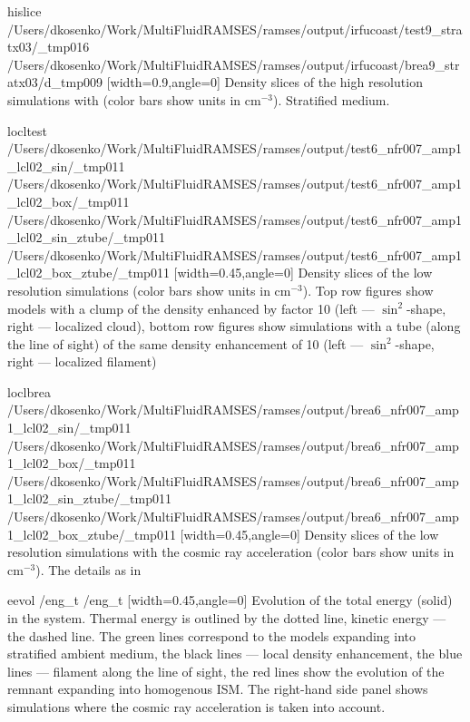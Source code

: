 \documentclass[referee,oldversion]{aa}
\def\basedir{/Users/dkosenko/Work/MultiFluidRAMSES/ramses/output}
\begin{document}
\def\thstra{\basedir/irfucoast/test9_stratx03}
\def\bhstra{\basedir/irfucoast/brea9_stratx03}
\def\slice{d_tmp009}
\FIGG hislice   {\thstra/_tmp016}  {\bhstra/\slice}  [width=0.9\hsize,angle=0]  Density slices of the high resolution simulations with (color bars show units in cm$^{-3}$). Stratified medium.


\def\clumsin{\basedir/test6_nfr007_amp1_lcl02_sin}
\def\clumbox{\basedir/test6_nfr007_amp1_lcl02_box}
\def\tubesin{\basedir/test6_nfr007_amp1_lcl02_sin_ztube}
\def\tubebox{\basedir/test6_nfr007_amp1_lcl02_box_ztube}
\def\slice{_tmp011}
\FIGfo locltest  {\clumsin/\slice}  {\clumbox/\slice}  {\tubesin/\slice}  {\tubebox/\slice} [width=0.45\hsize,angle=0]  Density slices of the low resolution simulations (color bars show units in cm$^{-3}$).  Top row figures show models with a clump of the density enhanced by factor 10 (left --- $\sin^2$-shape, right --- localized cloud), bottom row figures show simulations with a tube (along the line of sight) of the same density enhancement of 10 (left --- $\sin^2$-shape, right --- localized filament)

\def\clumsin{\basedir/brea6_nfr007_amp1_lcl02_sin}
\def\clumbox{\basedir/brea6_nfr007_amp1_lcl02_box}
\def\tubesin{\basedir/brea6_nfr007_amp1_lcl02_sin_ztube}
\def\tubebox{\basedir/brea6_nfr007_amp1_lcl02_box_ztube}
\def\slice{_tmp011}
\FIGfo loclbrea  {\clumsin/\slice}  {\clumbox/\slice}  {\tubesin/\slice}  {\tubebox/\slice} [width=0.45\hsize,angle=0]  Density slices of the low resolution simulations with the cosmic ray acceleration (color bars show units in cm$^{-3}$). The details as in 



\def\evol{eng_t}
\FIGG eevol  {\thom/\evol}  {\bhom/\evol}  [width=0.45\hsize,angle=0]  Evolution of the total energy (solid) in the system. Thermal energy is outlined by the dotted line, kinetic energy --- the dashed line. The green lines correspond to the models expanding into stratified ambient medium, the black lines --- local density enhancement, the blue lines --- filament along the line of sight, the red lines show the evolution of the remnant expanding into homogenous ISM. The right-hand side panel shows simulations where the cosmic ray acceleration is taken into account.
\end{document}
